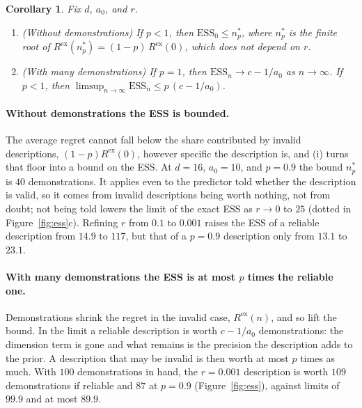 \documentclass[10pt]{article}
\newtheorem{corollary}[theorem]{Corollary}
\newcommand{\ess}{\mathrm{ESS}}
\begin{document}
\begin{corollary}\label{cor:ess}
Fix $d$, $a_0$, and $r$.
\begin{enumerate}
    \item[(i)] (Without demonstrations) If $p < 1$, then $\ess_0 \le n^*_p$, where $n^*_p$ is the finite root of $R^{\mathrm{ex}}(n^*_p) = (1-p)\,R^{\mathrm{ex}}(0)$, which does not depend on $r$.
    \item[(ii)] (With many demonstrations) If $p = 1$, then $\ess_n \to c - 1/a_0$ as $n \to \infty$. If $p < 1$, then $\limsup_{n \to \infty} \ess_n \le p\,(c - 1/a_0)$.
\end{enumerate}
\end{corollary}

\paragraph{Without demonstrations the ESS is bounded.} The average regret cannot fall below the share contributed by invalid descriptions, $(1-p)R^{\mathrm{ex}}(0)$, however specific the description is, and (i) turns that floor into a bound on the ESS. At $d = 16$, $a_0 = 10$, and $p = 0.9$ the bound $n^*_p$ is $40$ demonstrations. It applies even to the predictor told whether the description is valid, so it comes from invalid descriptions being worth nothing, not from doubt; not being told lowers the limit of the exact ESS as $r \to 0$ to $25$ (dotted in Figure~\ref{fig:ess}c). Refining $r$ from $0.1$ to $0.001$ raises the ESS of a reliable description from $14.9$ to $117$, but that of a $p = 0.9$ description only from $13.1$ to $23.1$.

\paragraph{With many demonstrations the ESS is at most $p$ times the reliable one.} Demonstrations shrink the regret in the invalid case, $R^{\mathrm{ex}}(n)$, and so lift the bound. In the limit a reliable description is worth $c - 1/a_0$ demonstrations: the dimension term is gone and what remains is the precision the description adds to the prior. A description that may be invalid is then worth at most $p$ times as much. With $100$ demonstrations in hand, the $r = 0.001$ description is worth $109$ demonstrations if reliable and $87$ at $p = 0.9$ (Figure~\ref{fig:ess}), against limits of $99.9$ and at most $89.9$.
\end{document}
